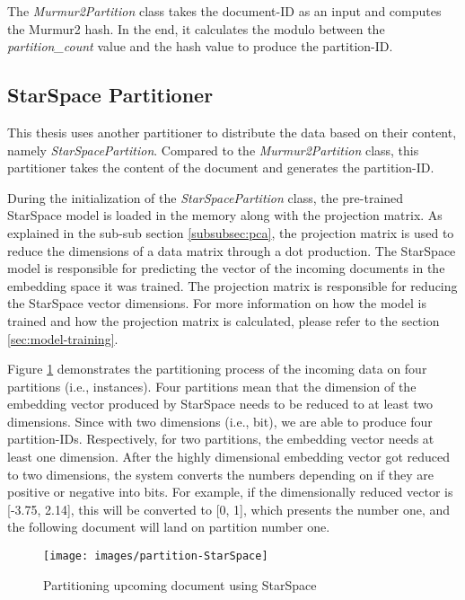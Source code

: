 The \emph{Murmur2Partition} class takes the document-ID as an input and computes the Murmur2 hash. In the end, it calculates the modulo between the \emph{partition\_count} value and the hash value to produce the partition-ID. 

\subsection{StarSpace Partitioner}
\label{subsec:partitioning-star-space}
This thesis uses another partitioner to distribute the data based on their content, namely \emph{StarSpacePartition}. Compared to the \emph{Murmur2Partition} class, this partitioner takes the content of the document and generates the partition-ID.


During the initialization of the  \emph{StarSpacePartition} class, the pre-trained StarSpace model is loaded in the memory along with the projection matrix. As explained in the sub-sub section \ref{subsubsec:pca}, the projection matrix is used to reduce the dimensions of a data matrix through a dot production. The StarSpace model is responsible for predicting the vector of the incoming documents in the embedding space it was trained. The projection matrix is responsible for reducing the StarSpace vector dimensions. For more information on how the model is trained and how the projection matrix is calculated, please refer to the section \ref{sec:model-training}.


Figure \ref{fig:star-space-partitioning-process} demonstrates the partitioning process of the incoming data on four partitions (i.e., instances). Four partitions mean that the dimension of the embedding vector produced by StarSpace needs to be reduced to at least two dimensions. Since with two dimensions (i.e., bit), we are able to produce four partition-IDs. Respectively, for two partitions, the embedding vector needs at least one dimension. After the highly dimensional embedding vector got reduced to two dimensions, the system converts the numbers depending on if they are positive or negative into bits. For example, if the dimensionally reduced vector is [-3.75, 2.14], this will be converted to [0, 1], which presents the number one, and the following document will land on partition number one.


\begin{figure}[!h]
    \centering
    \texttt{[image: images/partition-StarSpace]}
    \caption{Partitioning upcoming document using StarSpace}
    \label{fig:star-space-partitioning-process}
\end{figure}


